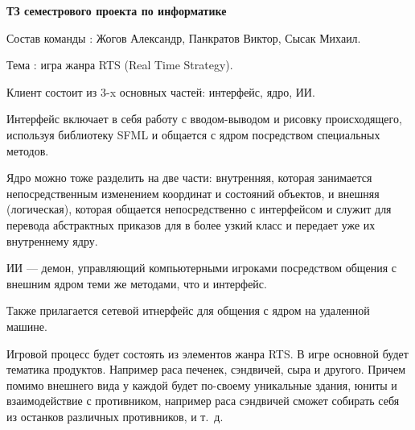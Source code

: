 \documentclass[a4paper]{article}
\begin{document}
\begin{center}
\Large\textbf{ТЗ семестрового проекта по информатике}
\end{center}

Состав команды : Жогов Александр, Панкратов Виктор, Сысак Михаил.

Тема : игра жанра RTS (Real Time Strategy).

Клиент состоит из $3$-x основных частей: интерфейс, ядро, ИИ.

Интерфейс включает в себя работу с вводом-выводом и рисовку происходящего, используя библиотеку SFML и общается с ядром посредством специальных методов.

Ядро можно тоже разделить на две части: внутренняя, которая занимается непосредственным изменением координат и состояний объектов, и внешняя (логическая), которая общается непосредственно с интерфейсом и служит для перевода абстрактных приказов для в более узкий класс и передает уже их внутреннему ядру.

ИИ --- демон, управляющий компьютерными игроками посредством общения с внешним ядром теми же методами, что и интерфейс.

Также прилагается сетевой итнерфейс для общения с ядром на удаленной машине.

Игровой процесс будет состоять из элементов жанра RTS. В игре основной будет тематика продуктов. Например раса печенек, сэндвичей, сыра и другого. Причем помимо внешнего вида у каждой будет по-своему уникальные здания, юниты и взаимодействие с противником, например раса сэндвичей сможет собирать себя из останков различных противников, и т.~д.




 
\end{document}
